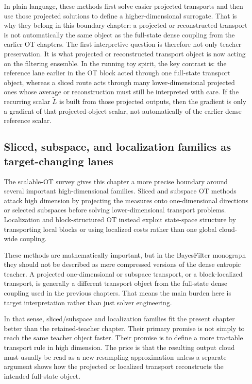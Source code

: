 In plain language, these methods first solve easier projected transports and then
use those projected solutions to define a higher-dimensional surrogate.  That is
why they belong in this boundary chapter: a projected or reconstructed transport is
not automatically the same object as the full-state dense coupling from the earlier
OT chapters.  The first interpretive question is therefore not only teacher
preservation.  It is what projected or reconstructed transport object is now acting
on the filtering ensemble.  In the running toy spirit, the key contrast is: the
reference lane earlier in the OT block acted through one full-state transport object,
whereas a sliced route acts through many lower-dimensional projected ones whose
average or reconstruction must still be interpreted with care.  If the recurring
scalar \(\widetilde L\) is built from those projected outputs, then the gradient is
only a gradient of that projected-object scalar, not automatically of the earlier
dense reference scalar.

\subsection{Sliced, subspace, and localization families as target-changing lanes}
\label{sec:bf-neural-ot-dynamic-sliced-localized}

The scalable-OT survey gives this chapter a more precise boundary around several
important high-dimensional families.  Sliced and subspace OT methods attack high
dimension by projecting the measures onto one-dimensional directions or selected
subspaces before solving lower-dimensional transport problems.  Localization and
block-structured OT instead exploit state-space structure by transporting local
blocks or using localized costs rather than one global cloud-wide coupling.

These methods are mathematically important, but in the BayesFilter monograph they
should not be described as mere compressed versions of the dense entropic teacher.
A projected one-dimensional or subspace transport, or a block-localized transport,
is generally a different transport object from the full-state dense coupling used
in the previous chapters.  That means the main burden here is target
interpretation rather than just solver engineering.

In that sense, sliced/subspace and localization families fit the present chapter
better than the retained-teacher chapter.  Their primary promise is not simply to
reach the same teacher object faster.  Their promise is to define a more tractable
transport rule in high dimension.  The price is that the resulting output cloud
must usually be read as a new resampling approximation unless a separate argument
shows how the projected or localized transport reconstructs the intended
full-state object.

